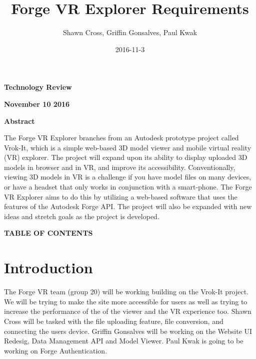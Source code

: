\documentclass[letterpaper, 10pt, draftclsnofoot, compsoc, onecolumn]{IEEEtran}
\title{Forge VR Explorer Requirements}
\author{Shawn Cross, Griffin Gonsalves, Paul Kwak}
\date{2016-11-3}
\begin{document}
\clearpage\setcounter{page}{1}\pagestyle{Standard}
\thispagestyle{FirstPage}

\bigskip

{\centering{}\bfseries\color{black}
Technology Review
\par}


\bigskip

{\centering{}\bfseries\color{black}
November 10 2016
\par}
\bigskip
\bigskip
\bigskip
\bigskip
\bigskip
\bigskip
\bigskip
\bigskip
\bigskip
\bigskip
\bigskip
\bigskip


\vfill
{\centering{}\bfseries\color{black}
Abstract
\par}

{\centering{}\mdseries\color{black}
	The Forge VR Explorer branches from an Autodesk prototype project called Vrok-It, which is a simple web-based 3D 
	model viewer and mobile virtual reality (VR) explorer. The project will expand upon its ability to display uploaded 3D 
	models in browser and in VR, and improve its accessibility. Conventionally, viewing 3D models in VR is a challenge if 
	you have model files on many devices, or have a headset that only works in conjunction with a smart-phone. The 
	Forge VR Explorer aims to do this by utilizing a web-based software that uses the features of the Autodesk Forge API. 
	The project will also be expanded with new ideas and stretch goals as the project is developed.
\par}
\clearpage
{\centering{}\bfseries\color{black}
TABLE OF CONTENTS
\par}

\bigskip

\setcounter{tocdepth}{9}
\renewcommand\contentsname{}
\tableofcontents

\bigskip
\clearpage


\section{Introduction}
	The Forge VR team (group 20) will be working building on the Vrok-It project. We will be trying to make the site more accessible for users
	as well as trying to increase the performance of the  of the viewer and the VR experience too. Shawn Cross will be tasked with the file
	uploading feature, file conversion, and connecting the users device. Griffin Gonsalves will be working on the Website UI Redesig, Data Management API
	and Model Viewer. Paul Kwak is going to be working on Forge Authentication.
	
\end{document}
